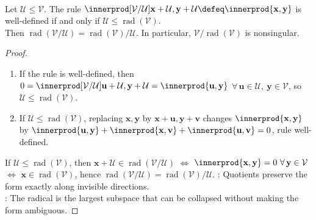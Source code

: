 \begin{proposition} \label{prop:metric-quotients-by-radical-subspaces} \\
Let $\mathcal{U}\leq\mathcal{V}$. The rule $\innerprod[\mathcal{V}/\mathcal{U}]{\mathbf{x}+\mathcal{U},\mathbf{y}+\mathcal{U}} \defeq \innerprod{\mathbf{x},\mathbf{y}}$ is well-defined if and only if $\mathcal{U}\leq\operatorname{rad}(\mathcal{V})$.\\
Then $\operatorname{rad}(\mathcal{V}/\mathcal{U}) =\operatorname{rad}(\mathcal{V})/\mathcal{U}$. In particular, $\mathcal{V}/\operatorname{rad}(\mathcal{V})$ is nonsingular.
\begin{proof}
\begin{enumerate}[label=\roman*.]
\setlength{\itemsep}{0pt}
\item[$(\Rightarrow)$] If the rule is well-defined, then $0=\innerprod[\mathcal{V}/\mathcal{U}]{\mathbf{u}+\mathcal{U},\mathbf{y}+\mathcal{U}} =\innerprod{\mathbf{u},\mathbf{y}}$ $\forall\,\mathbf{u}\in\mathcal{U},\ \mathbf{y}\in\mathcal{V}$, so $\mathcal{U}\leq\operatorname{rad}(\mathcal{V})$.
\item[$(\Leftarrow)$] If $\mathcal{U}\leq\operatorname{rad}(\mathcal{V})$, replacing $\mathbf{x},\mathbf{y}$ by $\mathbf{x}+\mathbf{u},\mathbf{y}+\mathbf{v}$ changes $\innerprod{\mathbf{x},\mathbf{y}}$ by $\innerprod{\mathbf{u},\mathbf{y}}+\innerprod{\mathbf{x},\mathbf{v}}+\innerprod{\mathbf{u},\mathbf{v}}=0$, rule well-defined.
\end{enumerate}
If $\mathcal{U}\leq\operatorname{rad}(\mathcal{V})$, then $\mathbf{x}+\mathcal{U}\in\operatorname{rad}(\mathcal{V}/\mathcal{U})$ $\Longleftrightarrow$ $\innerprod{\mathbf{x},\mathbf{y}}=0\ \forall\,\mathbf{y}\in\mathcal{V}$ $\Longleftrightarrow$ $\mathbf{x}\in\operatorname{rad}(\mathcal{V})$, hence $\operatorname{rad}(\mathcal{V}/\mathcal{U})=\operatorname{rad}(\mathcal{V})/\mathcal{U}$.
: Quotients preserve the form exactly along invisible directions.\\
: The radical is the largest subspace that can be collapsed without making the form ambiguous.
\end{proof}
\end{proposition}

